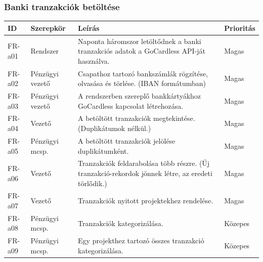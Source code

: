 \documentclass[a4paper,12pt]{article}
\begin{document}
\subsubsection{Banki tranzakciók betöltése}
\begin{table}[H]
  \centering
  \begin{tabular}{llL{8.5cm}l}
  \toprule
  ID & Szerepkör & Leírás & Prioritás \\
  \midrule
  FR-a01 & Rendszer         & Naponta háromszor letöltődnek a banki tranzakciós adatok a GoCardless API-ját használva.  & Magas   \\
  FR-a02 & Pénzügyi vezető  & Csapathoz tartozó bankszámlák rögzítése, olvasása és törlése. (IBAN formátumban)          & Magas   \\
  FR-a03 & Pénzügyi vezető  & A rendszerben szereplő bankkártyákhoz GoCardless kapcsolat létrehozása.                   & Magas   \\
  FR-a04 & Vezető           & A betöltött tranzakciók megtekintése. (Duplikátumok nélkül.)                              & Magas   \\
  FR-a05 & Pénzügyi mcsp.   & A betöltött tranzakciók jelölése duplikátumként.                                          & Magas   \\
  FR-a06 & Vezető           & Tranzakciók feldarabolása több részre. (Új tranzakció-rekordok jönnek létre, az eredeti törlődik.)  & Magas   \\
  FR-a07 & Vezető           & Tranzakciók nyitott projektekhez rendelése.                                               & Magas   \\
  FR-a08 & Pénzügyi mcsp.   & Tranzakciók kategorizálása.                                                               & Közepes \\
  FR-a09 & Pénzügyi mcsp.   & Egy projekthez tartozó összes tranzakció kategorizálása.                                  & Közepes \\
  \bottomrule
  \end{tabular}
\end{table}
\end{document}
